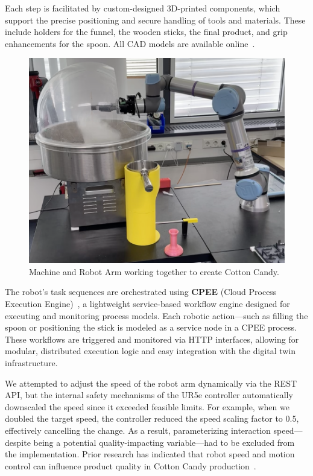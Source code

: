 Each step is facilitated by custom-designed 3D-printed components, which support the precise positioning and secure handling of tools and materials. These include holders for the funnel, the wooden sticks, the final product, and grip enhancements for the spoon. All CAD models are available online~\cite{cc-cad-models}.

\begin{figure}[h]
    \centering
    \includegraphics[width=0.85\linewidth]{figures/creating_cc.png}
    \caption{Machine and Robot Arm working together to create Cotton Candy.}
    \label{fig:creating_cc}
\end{figure}

The robot's task sequences are orchestrated using \textbf{CPEE} (Cloud Process Execution Engine)~\cite{mangler2022cloudprocessexecutionengine}, a lightweight service-based workflow engine designed for executing and monitoring process models. Each robotic action—such as filling the spoon or positioning the stick is modeled as a service node in a CPEE process. These workflows are triggered and monitored via HTTP interfaces, allowing for modular, distributed execution logic and easy integration with the digital twin infrastructure.

We attempted to adjust the speed of the robot arm dynamically via the REST API, but the internal safety mechanisms of the UR5e controller automatically downscaled the speed since it exceeded feasible limits. For example, when we doubled the target speed, the controller reduced the speed scaling factor to 0.5, effectively cancelling the change. As a result, parameterizing interaction speed—despite being a potential quality-impacting variable—had to be excluded from the implementation. Prior research has indicated that robot speed and motion control can influence product quality in Cotton Candy production~\cite{TERASHIMA2022139953}.


